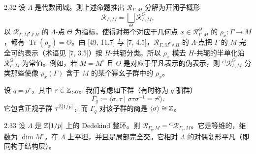 \begin{rem}{2.32}
设 $\Lambda$ 是代数闭域。则上述命题推出 $\mathcal R_{\Gamma,M}$ 分解为开闭子概形
\[
\mathcal R_{\Gamma,M} = \bigsqcup_\Theta \mathcal R^{\Theta}_{\Gamma,M},
\]
以 $\mathcal R_{\Gamma,M^\bullet\sslash H}$ 的 $\Lambda$-点 $\Theta$ 为指标，使得对每个对应于几何点 $x \in \mathcal R^{\Theta}_{\Gamma,M}$ 的 $\rho_x\colon \Gamma \to M$，都有 $\operatorname{Tr}(\rho_x) = \Theta$。由 [49, 11.7] 与 [7, 4.5]，$\mathcal R_{\Gamma,M^\bullet\sslash H}$ 的 $\Lambda$-点把 $\Gamma$ 的 $M$-完全可约表示（术语见 [7, 3.5]）按 $H$-共轭分类。所以 $\rho_x$ 模去 $H$-共轭的半单化沿 $\mathcal R^{\Theta}_{\Gamma,M}$ 为常值。例如，若 $M = M^\circ$ 且 $\Theta$ 是对应于平凡表示的伪表示，则 ${}^{\mathrm{cl}}\mathcal R^{\Theta}_{\Gamma,M}$ 分类那些使像 $\rho_x(\Gamma)$ 含于 $M$ 的某个幂幺子群中的 $\rho_x$。
\label{rem:zhu2-2-32}
\end{rem}

设 $q = p^r$，其中 $r \in \mathbb{Z}_{>0}$。我们考虑如下群（有时称为 $q$-驯群）
\begin{equation}
\tag{2.23}
\Gamma_q := \langle \sigma, \tau \mid \sigma\tau\sigma^{-1} = \tau^q\rangle .
\end{equation}
它包含正规子群 $\tau^{\mathbb{Z}[1/p]}$，而 $\Gamma_q$ 对该子群的商是 $\langle\sigma\rangle \cong \mathbb{Z}$。

\begin{prop}{2.33}
设 $\Lambda$ 是 $\mathbb{Z}[1/p]$ 上的 Dedekind 整环。则 $\mathcal R_{\Gamma_q,M} = {}^{\mathrm{cl}}\mathcal R_{\Gamma_q,M}$。它是等维的，维数为 $\dim M^\circ$，在 $\Lambda$ 上平坦，并且是局部完全交。它相对 $\Lambda$ 的对偶复形平凡（即同构于结构层）。
\label{prop:zhu2-2-33}
\end{prop}

